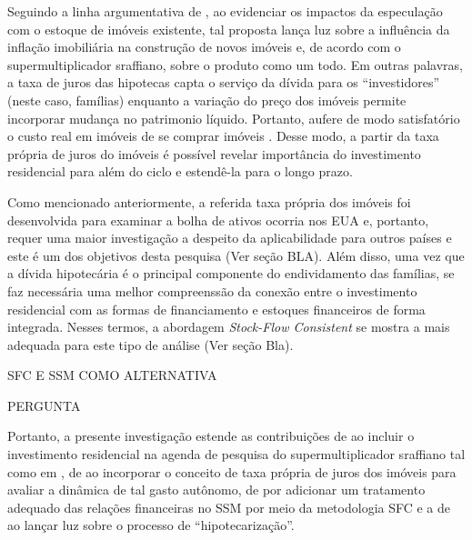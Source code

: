Seguindo a linha argumentativa de \textcite{teixeira_crescimento_2015}, ao evidenciar os impactos da especulação com o estoque de imóveis existente, tal proposta lança luz sobre a influência da inflação imobiliária na construção de novos imóveis e, de acordo com o supermultiplicador sraffiano, sobre o produto como um todo. Em outras palavras, a taxa de juros das hipotecas capta o serviço da dívida para os ``investidores'' (neste caso, famílias) enquanto a variação do preço dos imóveis permite incorporar mudança no patrimonio líquido. Portanto, aufere de modo satisfatório o custo real em imóveis de se comprar imóveis \cite[p.~53]{teixeira_crescimento_2015}. Desse modo, a partir da taxa própria de juros do imóveis é possível revelar importância do investimento residencial para além do ciclo e estendê-la para o longo prazo.  

Como mencionado anteriormente, a referida taxa própria dos imóveis foi desenvolvida para examinar a bolha de ativos ocorria nos EUA e, portanto, requer uma maior investigação a despeito da aplicabilidade para outros países e este é um dos objetivos desta pesquisa (Ver seção BLA). Além disso, uma vez que a dívida hipotecária é o principal componente do endividamento das famílias, se faz necessária uma melhor compreenssão da conexão entre o investimento residencial com as formas de financiamento e estoques financeiros de forma integrada. Nesses termos, a abordagem \textit{Stock-Flow Consistent} se mostra a mais adequada para este tipo de análise (Ver seção Bla).

SFC E SSM COMO ALTERNATIVA

PERGUNTA

Portanto, a presente investigação estende as contribuições de \textcite{serrano_sraffian_1995} ao incluir o investimento residencial na agenda de pesquisa do supermultiplicador sraffiano tal como em \textcite{da_silveira_investimento_2019}, de \textcite{teixeira_crescimento_2015} ao incorporar o conceito de taxa própria de juros dos imóveis para avaliar a dinâmica de tal gasto autônomo, de \textcite{brochier_supermultiplier_2018} por adicionar um tratamento adequado das relações financeiras no SSM por meio da metodologia SFC 
e a de \textcite{jorda_great_2014} ao lançar luz sobre o processo de ``hipotecarização''. 

